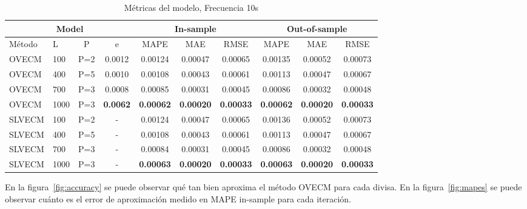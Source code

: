 \begin{table}[ht!]
\caption{Métricas del modelo, Frecuencia 10s}
\label{tab:mapes_10s}
\begin{center}
\begin{adjustbox}{max width=\textwidth}
\begin{tabular}{|l|l|c|c|c|c|c|c|c|c|}
\hline
\multicolumn{4}{|c|}{Model} & \multicolumn{3}{|c|}{In-sample} &
\multicolumn{3}{|c|}{Out-of-sample} \\ 
\hline
\hline
Método & L & P & e &
MAPE & MAE& RMSE&
MAPE & MAE& RMSE \\
\hline
 OVECM  &   100  &  P=2 &  0.0012  &  0.00124  &  0.00047  &  0.00065  &  0.00135  &  0.00052  &  0.00073 \\
 OVECM  &   400  &  P=5 &  0.0010  &  0.00108  &  0.00043  &  0.00061  &  0.00113  &  0.00047  &  0.00067 \\
 OVECM  &   700  &  P=3 &  0.0008  &  0.00085  &  0.00031  &  0.00045  &  0.00086  &  0.00032  &  0.00048 \\
 OVECM  &   1000 &  P=3 &  \textbf{0.0062}  &  \textbf{0.00062}  &  \textbf{0.00020}  &  \textbf{0.00033}  &  
      \textbf{0.00062}  &  \textbf{0.00020}  &  \textbf{0.00033} \\
\hline
 SLVECM  &   100 &  P=2 & -  &  0.00124  &  0.00047  &  0.00065  &  0.00136  &  0.00052  &  0.00073 \\
 SLVECM  &   400 &  P=5 & -  &  0.00108  &  0.00043  &  0.00061  &  0.00113  &  0.00047  &  0.00067 \\
 SLVECM  &   700 &  P=3 & -  &  0.00084  &  0.00031  &  0.00045  &  0.00086  &  0.00032  &  0.00048 \\
 SLVECM  &   1000 &  P=3& -  &  \textbf{0.00063}  &  \textbf{0.00020}  &  \textbf{0.00033}  &  
      \textbf{0.00063}  &  \textbf{0.00020}  &  \textbf{0.00033} \\
\hline
\end{tabular}
\end{adjustbox}
\end{center}
\end{table}

En la figura~\ref{fig:accuracy} se puede observar qué tan bien aproxima el
método OVECM para cada divisa. En la figura~\ref{fig:mapes} se puede observar
cuánto es el error de aproximación medido en MAPE in-sample para cada iteración.

